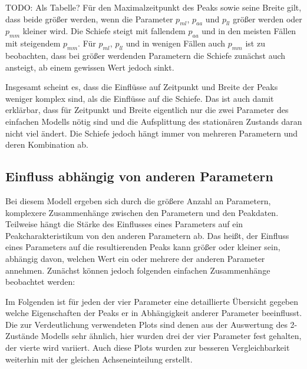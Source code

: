 TODO: Als Tabelle? 
Für den Maximalzeitpunkt des Peaks sowie seine Breite gilt, dass beide größer werden, wenn die Parameter $p_{ml}$, $p_{aa}$ und $p_{ll}$ größer werden oder $p_{mm}$ kleiner wird. 
Die Schiefe steigt mit fallendem $p_{aa}$ und in den meisten Fällen mit steigendem $p_{mm}$. Für $p_{ml}$, $p_{ll}$ und in wenigen Fällen auch $p_{mm}$ ist zu beobachten, dass bei größer werdenden Parametern die Schiefe zunächst auch ansteigt, ab einem gewissen Wert jedoch sinkt.

Insgesamt scheint es, dass die Einflüsse auf Zeitpunkt und Breite der Peaks weniger komplex sind, als die Einflüsse auf die Schiefe. Das ist auch damit erklärbar, dass für Zeitpunkt und Breite eigentlich nur die zwei Parameter des einfachen Modells nötig sind und die Aufsplittung des stationären Zustands daran nicht viel ändert. Die Schiefe jedoch hängt immer von mehreren Parametern und deren Kombination ab.

\subsection{Einfluss abhängig von anderen Parametern}

Bei diesem Modell ergeben sich durch die größere Anzahl an Parametern, komplexere Zusammenhänge zwischen den Parametern und den Peakdaten. Teilweise hängt die Stärke des Einflusses eines Parameters auf ein Peakcharakteristikum von den anderen Parametern ab. Das heißt, der Einfluss eines Parameters auf die resultierenden Peaks kann größer oder kleiner sein, abhängig davon, welchen Wert ein oder mehrere der anderen Parameter annehmen.
Zunächst können jedoch folgenden einfachen Zusammenhänge beobachtet werden:


Im Folgenden ist für jeden der vier Parameter eine detaillierte Übersicht gegeben welche Eigenschaften der Peaks er in Abhängigkeit anderer Parameter beeinflusst. Die zur Verdeutlichung verwendeten Plots sind denen aus der Auswertung des 2-Zustände Modells sehr ähnlich, hier wurden drei der vier Parameter fest gehalten, der vierte wird variiert. Auch diese Plots wurden zur besseren Vergleichbarkeit weiterhin mit der gleichen Achseneinteilung erstellt. 


